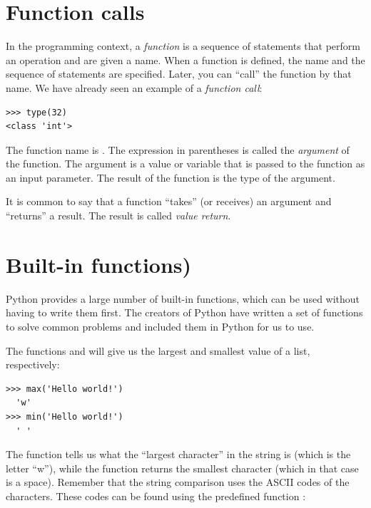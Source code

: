 \hypertarget{functionchap}{%
\section{Function calls}\label{functionchap}}


In the programming context, a \emph{function} is a sequence of statements that perform an operation and are given a name. When a function is defined, the name and the sequence of statements are specified. Later, you can ``call'' the function by that name. We have already seen an example of a \emph{function call}:

\begin{Verbatim}[frame=single]
>>> type(32)
<class 'int'>
\end{Verbatim}


The function name is . The expression in parentheses is called the \emph{argument} of the function. The argument is a value or variable that is passed to the function as an input parameter. The result of the  function is the type of the argument.


It is common to say that a function ``takes'' (or receives) an argument and ``returns'' a result. The result is called \emph{value return}.

 

\section{Built-in functions)}\label{funciones-predefinidad}

Python provides a large number of built-in functions, which can be used without having to write them first. The creators of Python have written a set of functions to solve common problems and included them in Python for us to use.

The functions  and  will give us the largest and smallest value of a list, respectively:

\begin{Verbatim}[frame=single]
>>> max('Hello world!')
  'w'
>>> min('Hello world!')
  ' '
\end{Verbatim}

The  function tells us what the ``largest character'' in the string is (which is the letter ``w''), while the  function returns the smallest character (which in that case is a space). Remember that the string comparison uses the ASCII codes of the characters. These codes can be found using the predefined function :

